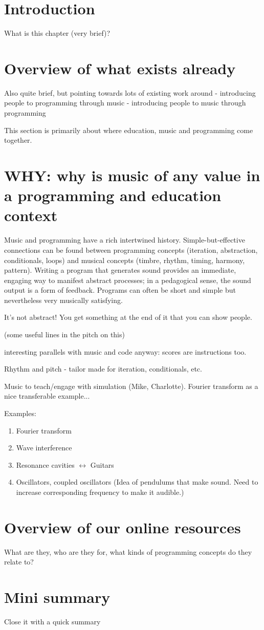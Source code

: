 \section{Introduction}
What is this chapter (very brief)?

\section{Overview of what exists already}
Also quite brief, but pointing towards lots of existing work around
 - introducing people to programming through music
 - introducing people to music through programming

 This section is primarily about where education, music and programming come together.

 

\section{WHY: why is music of any value in a programming and education context}

Music and programming have a rich intertwined history. Simple-but-effective connections can be found between programming concepts (iteration, abstraction, conditionals, loops) and musical concepts (timbre, rhythm, timing, harmony, pattern). Writing a program that generates sound provides an immediate, engaging way to manifest abstract processes; in a pedagogical sense, the sound output is a form of feedback. Programs can often be short and simple but nevertheless very musically satisfying. 



It's not abstract! You get something at the end of it that you can show people.

(some useful lines in the pitch on this)

interesting parallels with music and code anyway: scores are instructions too.

Rhythm and pitch - tailor made for iteration, conditionals, etc.

Music to teach/engage with simulation (Mike, Charlotte). Fourier transform as a nice transferable example...

Examples:
\begin{enumerate}
    \item Fourier transform
    \item Wave interference
    \item Resonance cavities $\leftrightarrow{}$ Guitars
    \item Oscillators, coupled oscillators (Idea of pendulums that make sound. Need to increase corresponding frequency to make it audible.)
\end{enumerate}

\section{Overview of our online resources}
What are they, who are they for, what kinds of programming concepts do they relate to?

\section{Mini summary}
Close it with a quick summary

